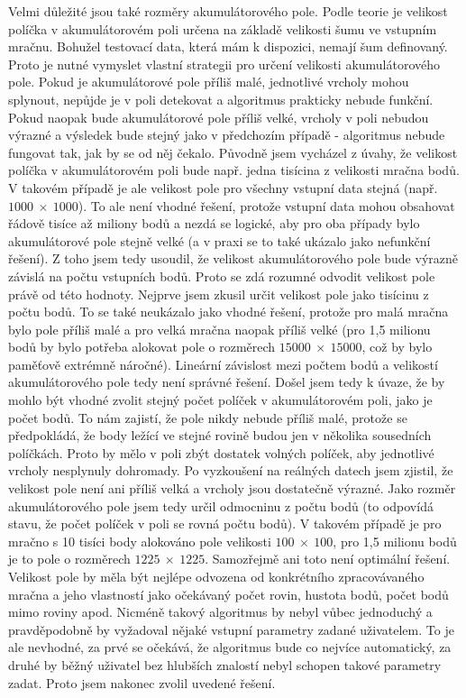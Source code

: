\documentclass[11pt,twoside,a4paper]{book}
\begin{document}
Velmi důležité jsou také rozměry akumulátorového pole. Podle teorie je velikost políčka v akumulátorovém poli určena na základě velikosti šumu ve vstupním mračnu. Bohužel testovací data, která mám k dispozici, nemají šum definovaný. Proto je nutné vymyslet vlastní strategii pro určení velikosti akumulátorového pole. Pokud je akumulátorové pole příliš malé, jednotlivé vrcholy mohou splynout, nepůjde je v poli detekovat a algoritmus prakticky nebude funkční. Pokud naopak bude akumulátorové pole příliš velké, vrcholy v poli nebudou výrazné a výsledek bude stejný jako v předchozím případě - algoritmus nebude fungovat tak, jak by se od něj čekalo. Původně jsem vycházel z úvahy, že velikost políčka v akumulátorovém poli bude např. jedna tisícina z velikosti mračna bodů. V takovém případě je ale velikost pole pro všechny vstupní data stejná (např. $1000~\times~1000$). To ale není vhodné řešení, protože vstupní data mohou obsahovat řádově tisíce až miliony bodů a nezdá se logické, aby pro oba případy bylo akumulátorové pole stejně velké (a v praxi se to také ukázalo jako nefunkční řešení). Z toho jsem tedy usoudil, že velikost akumulátorového pole bude výrazně závislá na počtu vstupních bodů. Proto se zdá rozumné odvodit velikost pole právě od této hodnoty. Nejprve jsem zkusil určit velikost pole jako tisícinu z počtu bodů. To se také neukázalo jako vhodné řešení, protože pro malá mračna bylo pole příliš malé a pro velká mračna naopak příliš velké (pro 1,5 milionu bodů by bylo potřeba alokovat pole o rozměrech $15000~\times~15000$, což by bylo paměťově extrémně náročné). Lineární závislost mezi počtem bodů a velikostí akumulátorového pole tedy není správné řešení. Došel jsem tedy k úvaze, že by mohlo být vhodné zvolit stejný počet políček v akumulátorovém poli, jako je počet bodů. To nám zajistí, že pole nikdy nebude příliš malé, protože se předpokládá, že body ležící ve stejné rovině budou jen v několika sousedních políčkách. Proto by mělo v poli zbýt dostatek volných políček, aby jednotlivé vrcholy nesplynuly dohromady. Po vyzkoušení na reálných datech jsem zjistil, že velikost pole není ani příliš velká a vrcholy jsou dostatečně výrazné. Jako rozměr akumulátorového pole jsem tedy určil odmocninu z počtu bodů (to odpovídá stavu, že počet políček v poli se rovná počtu bodů). V takovém případě je pro mračno s 10 tisíci body alokováno pole velikosti $100~\times~100$, pro 1,5 milionu bodů je to pole o rozměrech $1225~\times~1225$. Samozřejmě ani toto není optimální řešení. Velikost pole by měla být nejlépe odvozena od konkrétního zpracovávaného mračna a jeho vlastností jako očekávaný počet rovin, hustota bodů, počet bodů mimo roviny apod. Nicméně takový algoritmus by nebyl vůbec jednoduchý a pravděpodobně by vyžadoval nějaké vstupní parametry zadané uživatelem. To je ale nevhodné, za prvé se očekává, že algoritmus bude co nejvíce automatický, za druhé by běžný uživatel bez hlubších znalostí nebyl schopen takové parametry zadat. Proto jsem nakonec zvolil uvedené řešení.
\end{document}
